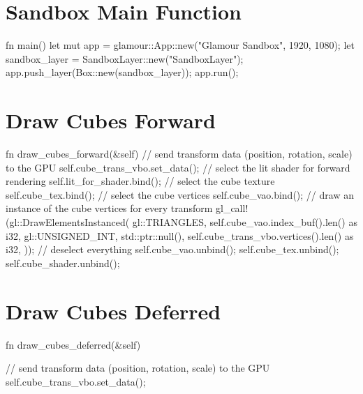 \begin{appendices}
  \section{Sandbox Main Function}\label{app:sandbox-main}
  \begin{rustcode}
fn main() {
    let mut app = glamour::App::new("Glamour Sandbox", 1920, 1080);
    let sandbox_layer = SandboxLayer::new("SandboxLayer");
    app.push_layer(Box::new(sandbox_layer));
    app.run();
}
  \end{rustcode}

  \section{Draw Cubes Forward}\label{app:draw-cubes-forward}
  \begin{rustcode}
fn draw_cubes_forward(&self) {
    // send transform data (position, rotation, scale) to the GPU
    self.cube_trans_vbo.set_data();
    // select the lit shader for forward rendering
    self.lit_for_shader.bind();
    // select the cube texture
    self.cube_tex.bind();
    // select the cube vertices
    self.cube_vao.bind();
    // draw an instance of the cube vertices for every transform
    gl_call!(gl::DrawElementsInstanced(
        gl::TRIANGLES,
        self.cube_vao.index_buf().len() as i32,
        gl::UNSIGNED_INT,
        std::ptr::null(),
        self.cube_trans_vbo.vertices().len() as i32,
    ));
    // deselect everything
    self.cube_vao.unbind();
    self.cube_tex.unbind();
    self.cube_shader.unbind();
}
  \end{rustcode}

  \section{Draw Cubes Deferred}\label{app:draw-cubes-deferred}
  \begin{rustcode}
fn draw_cubes_deferred(&self) {
    // send transform data (position, rotation, scale) to the GPU
    self.cube_trans_vbo.set_data();

}
\end{rustcode}
\end{appendices}
